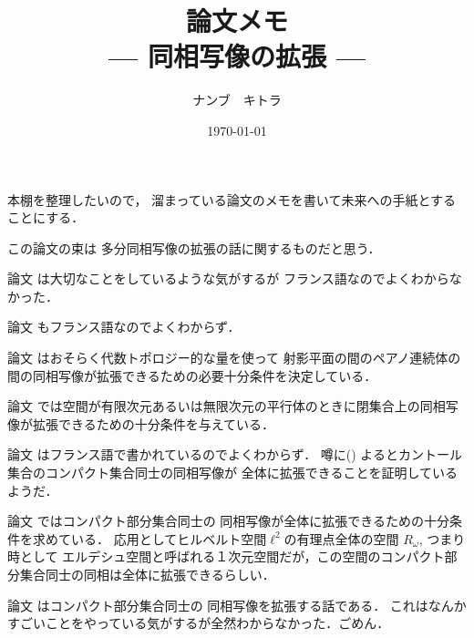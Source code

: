 \documentclass[leqno, a4paper, 12pt]{jsarticle}
\title{論文メモ
\large{\\--- 同相写像の拡張 ---}
}
\author{ナンブ　キトラ}
\date{\today}
\begin{document}
\maketitle

本棚を整理したいので，
溜まっている論文のメモを書いて未来への手紙とすることにする．

この論文の束は
多分同相写像の拡張の話に関するものだと思う．


論文
\cite{antoine1924voisinages}
は大切なことをしているような気がするが
フランス語なのでよくわからなかった．

論文
\cite{lavrentieff1924contribution}
もフランス語なのでよくわからず．

論文
\cite{MR0029505}
はおそらく代数トポロジー的な量を使って
射影平面の間のペアノ連続体の間の同相写像が拡張できるための必要十分条件を決定している．

論文
\cite{MR0004767}
では空間が有限次元あるいは無限次元の平行体のときに閉集合上の同相写像が拡張できるための十分条件を与えている．


論文
\cite{knaster1953notion}
はフランス語で書かれているのでよくわからず．
噂に(\cite{MR0320992})
よるとカントール集合のコンパクト集合同士の同相写像が
全体に拡張できることを証明しているようだ．

論文
\cite{MR0320992}
ではコンパクト部分集合同士の
同相写像が全体に拡張できるための十分条件を求めている．
応用としてヒルベルト空間$\ell^{2}$の有理点全体の空間
$R_{\omega}$, つまり時として エルデシュ空間と呼ばれる１次元空間だが，この空間のコンパクト部分集合同士の同相は全体に拡張できるらしい．


論文
\cite{MR0930078}
はコンパクト部分集合同士の
同相写像を拡張する話である．
これはなんかすごいことをやっている気がするが全然わからなかった．ごめん．




\nocite{*}


\end{document}
